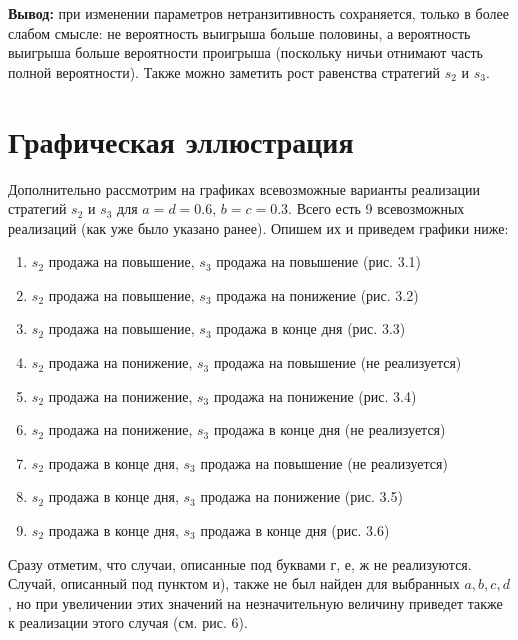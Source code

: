 \textbf{Вывод:} при изменении параметров нетранзитивность сохраняется, только в более слабом смысле: не вероятность выигрыша больше половины, а вероятность выигрыша больше вероятности проигрыша (поскольку ничьи отнимают часть полной вероятности). Также можно заметить рост равенства стратегий $s_2$ и $s_3$.

\section{Графическая эллюстрация}
Дополнительно рассмотрим на графиках всевозможные варианты реализации стратегий $s_2$ и $s_3$ для $a = d = 0.6$, $b = c = 0.3$. Всего есть 9 всевозможных реализаций (как уже было указано ранее). Опишем их и приведем графики ниже:

\begin{enumerate}
    \item $s_2$ продажа на повышение, $s_3$ продажа на повышение (рис. 3.1)
    \item $s_2$ продажа на повышение, $s_3$ продажа на понижение (рис. 3.2)
    \item $s_2$ продажа на повышение, $s_3$ продажа в конце дня (рис. 3.3)
    \item $s_2$ продажа на понижение, $s_3$ продажа на повышение (не реализуется)
    \item $s_2$ продажа на понижение, $s_3$ продажа на понижение (рис. 3.4)
    \item $s_2$ продажа на понижение, $s_3$ продажа в конце дня (не реализуется)
    \item $s_2$ продажа в конце дня, $s_3$ продажа на повышение (не реализуется)
    \item $s_2$ продажа в конце дня, $s_3$ продажа на понижение (рис. 3.5)
    \item $s_2$ продажа в конце дня, $s_3$ продажа в конце дня (рис. 3.6)
\end{enumerate}
\smallskip

Сразу отметим, что случаи, описанные под буквами г, е, ж не реализуются. Случай, описанный под пунктом и), также не был найден для выбранных  $a, b, c, d$, но при увеличении этих значений на незначительную величину приведет также к реализации этого случая (см. рис. 6). 


